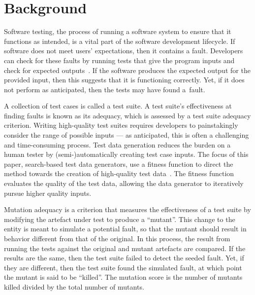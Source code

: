 \section{Background}\label{sec:background}


Software testing, the process of running a software system to ensure that it functions as intended, is a vital part of
the software development lifecycle. If software does not meet users' expectations, then it contains a fault.  Developers
can check for these faults by running tests that give the program inputs and check for expected
outputs~\cite{ammann2008}.  If the software produces the expected output for the provided input, then this suggests that
it is functioning correctly.  Yet, if it does not perform as anticipated, then the tests may have found \mbox{a fault}.


A collection of test cases is called a test suite. A test suite's effectiveness at finding faults is known as its
adequacy, which is assessed by a test suite adequacy criterion.  Writing high-quality test suites requires developers to
painstakingly consider the range of possible inputs --- as anticipated, this is often a challenging and time-consuming
process. Test data generation reduces the burden on a human tester by (semi-)automatically creating test case inputs.
The focus of this paper, search-based test data generators, use a fitness function to direct the method towards the
creation of high-quality test data~\cite{STVR:STVR294}. The fitness function evaluates the quality of the test data,
allowing the data generator to iteratively pursue higher quality inputs.


Mutation adequacy is a criterion that measures the effectiveness of a test suite by modifying the artefact under test to
produce a ``mutant''. This change to the entity is meant to simulate a potential fault, so that the mutant should result
in behavior different from that of the original. In this process, the result from running the tests against the original
and mutant artefacts are compared. If the results are the same, then the test suite failed to detect the seeded fault.
Yet, if they are different, then the test suite found the simulated fault, at which point the mutant is said to be
``killed''.  The mutation score is the number of mutants killed divided by the total number of mutants.

